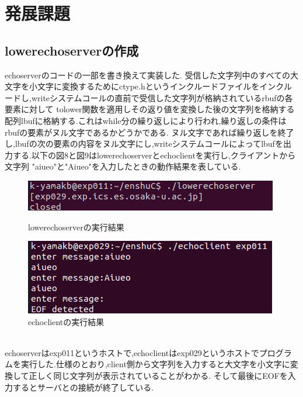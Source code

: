\documentclass[dvipdfmx]{jarticle}
\begin{document}
\section{発展課題}
\subsection{lowerechoserverの作成}
echoserverのコードの一部を書き換えて実装した.
受信した文字列中のすべての大文字を小文字に変換するためにctype.hというインクルードファイルをインクルードし,writeシステムコールの直前で受信した文字列が格納されているrbufの各要素に対して
tolower関数を適用しその返り値を変換した後の文字列を格納する配列lbufに格納する.これはwhile分の繰り返しにより行われ,繰り返しの条件はrbufの要素がヌル文字であるかどうかである.
ヌル文字であれば繰り返しを終了し,lbufの次の要素の内容をヌル文字にし,writeシステムコールによってlbufを出力する.以下の図8と図9はlowerechoserverとechoclientを実行し,クライアントから文字列
"aiueo"と"Aiueo"を入力したときの動作結果を表している.
\begin{figure}[htbp]
    \begin{minipage}[b]{0.45\linewidth}
      \centering
      \includegraphics[keepaspectratio, scale=0.5]{3-1server.png}
      \caption{lowerechoserverの実行結果}
    \end{minipage}
    \begin{minipage}[b]{0.45\linewidth}
      \centering
      \includegraphics[keepaspectratio, scale=0.5]{3-1client.png}
      \caption{echoclientの実行結果}
    \end{minipage}
\end{figure}
\\echoserverはexp011というホストで,echoclientはexp029というホストでプログラムを実行した.仕様のとおり,client側から文字列を入力すると大文字を小文字に変換して正しく同じ文字列が表示されていることがわかる.
そして最後にEOFを入力するとサーバとの接続が終了している.
\end{document}
